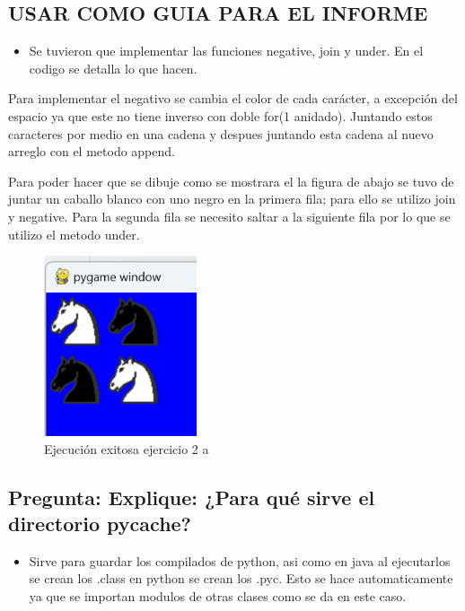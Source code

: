 \documentclass{article}
\begin{document}
	\subsection{USAR COMO GUIA PARA EL INFORME}
	\begin{itemize}	
		\item Se tuvieron que implementar las funciones negative, join y under. 
		En el codigo se detalla lo que hacen.
	\end{itemize}
	
	Para implementar el negativo se cambia el color de cada carácter, a excepción del espacio
	ya que este no tiene inverso con doble for(1 anidado). Juntando estos caracteres
	por medio en una cadena y despues juntando esta cadena al nuevo arreglo 
	con el metodo append.
	
	Para poder hacer que se dibuje como se mostrara el la figura de abajo se tuvo de juntar un caballo
	blanco con uno negro en la primera fila; para ello se utilizo join y negative. Para la segunda
	fila se necesito saltar a la siguiente fila por lo que se utilizo el metodo under.
	\begin{figure}[H]
		\centering
		\includegraphics[width=0.4\textwidth,keepaspectratio]{img/e2a.png}
		\caption{Ejecución exitosa ejercicio 2 a}
	\end{figure}
\subsection{Pregunta: Explique: ¿Para qué sirve el directorio pycache?}
\begin{itemize}
	\item Sirve para guardar los compilados de python, asi como en java al ejecutarlos se crean
	los .class en python se crean los .pyc. Esto se hace automaticamente ya que se importan 
	modulos de otras clases como se da en este caso.
\end{itemize}
	\clearpage	
\end{document}

